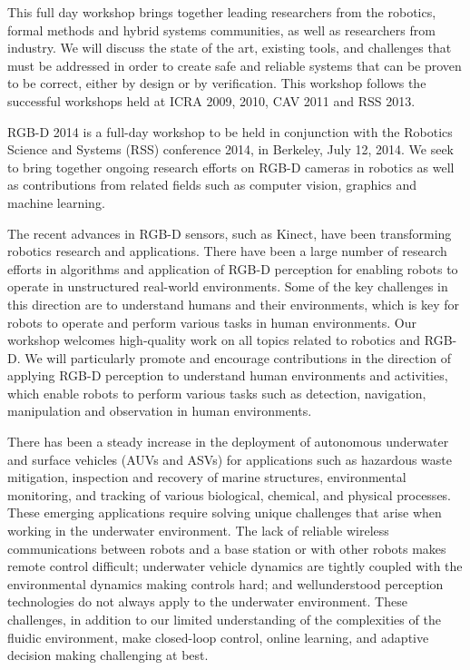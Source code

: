 \begin{spacing}{1.0}
{This full day workshop brings together leading researchers from the robotics, formal methods and hybrid systems communities, as well as researchers from industry. We will discuss the state of the art, existing tools, and challenges that must be addressed in order to create safe and reliable systems that can be proven to be correct, either by design or by verification. This workshop follows the successful workshops held at ICRA 2009, 2010, CAV 2011 and RSS 2013.
}

{
RGB-D 2014 is a full-day workshop to be held in conjunction with the Robotics Science and Systems (RSS) conference 2014, in Berkeley, July 12, 2014. We seek to bring together ongoing research efforts on RGB-D cameras in robotics as well as contributions from related fields such as computer vision, graphics and machine learning.

The recent advances in RGB-D sensors, such as Kinect, have been transforming robotics research and applications. There have been a large number of research efforts in algorithms and application of RGB-D perception for enabling robots to operate in unstructured real-world environments. Some of the key challenges in this direction are to understand humans and their environments, which is key for robots to operate and perform various tasks in human environments. Our workshop welcomes high-quality work on all topics related to robotics and RGB-D. We will particularly promote and encourage contributions in the direction of applying RGB-D perception to understand human environments and activities, which enable robots to perform various tasks such as detection, navigation, manipulation and observation in human environments.


}



{
There has been a steady increase in the deployment of autonomous underwater and surface vehicles (AUVs and ASVs) for applications such as hazardous waste mitigation, inspection and recovery of marine structures, environmental monitoring, and tracking of various biological, chemical, and physical processes. These emerging applications require solving unique challenges that arise when working in the underwater environment. The lack of reliable wireless communications between robots and a base station or with other robots makes remote control difficult; underwater vehicle dynamics are tightly coupled with the environmental dynamics making controls hard; and wellunderstood perception technologies do not always apply to the underwater environment. These challenges, in addition to our limited understanding of the complexities of the fluidic environment, make closed-loop control, online learning, and adaptive decision making challenging at best. 

}
\end{spacing}
